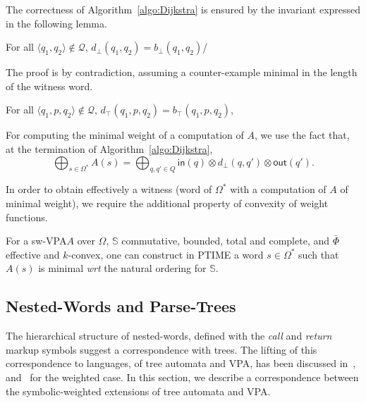 \documentclass[runningheads]{llncs}
\def\wrt{\textit{wrt}\xspace}
\def\<#1>{\langle #1 \rangle}
\newcommand{\Q}{\mathcal{Q}}
\newcommand{\Semiring}{\mathbb{S}}
\def\SWVPA{\textsf{sw-VPA}\xspace}
\begin{document}
The correctness of Algorithm~\ref{algo:Dijkstra} 
is ensured by the invariant expressed in the following lemma.
\begin{lemma}\label{lem:bot}
For all $\< q_1, q_2> \notin \Q$,
$d_\bot(q_1, q_2) =  b_\bot(q_1, q_2)$/
\end{lemma}
The proof is by contradiction, 
assuming a counter-example minimal in the length of the witness word.

\begin{lemma}\label{lem:top}
For all $\< q_1, p, q_2> \notin \Q$, 
$d_\top(q_1, p, q_2) =  b_\top(q_1, p, q_2)$,
\end{lemma}

\noindent
For computing the minimal weight of a computation of $A$, we use the fact that,
at the termination of Algorithm~\ref{algo:Dijkstra}, %
\[
  {\displaystyle \bigoplus_{s \in \Omega^*} A(s)} = 
  {\displaystyle\bigoplus_{q, q' \in Q}} \textstyle
  \mathsf{in}(q) \mathop{\otimes} d_\bot(q, q') \mathop{\otimes} \mathsf{out}(q').
\]

\noindent
In order to obtain effectively a witness 
(word of $\Omega^*$ with a computation of $A$ of minimal weight), 
we require the additional property of convexity of weight functions.

\begin{proposition}\label{th:best-search}
For a \SWVPA $A$ 
over $\Omega$, 
$\Semiring$ commutative, bounded, total and complete, %
and $\bar\Phi$ effective and $k$-convex, %
one can construct in PTIME a word $s \in \Omega^*$ 
such that $A(s)$ is minimal \wrt the natural ordering for $\Semiring$. 
\end{proposition} 



\subsection{Nested-Words and Parse-Trees}
\label{sec:trees}
The hierarchical structure of nested-words, defined with the \emph{call} and \emph{return} markup symbols  
suggest a correspondence with trees. 
The lifting of this correspondence to languages, of tree automata and VPA,
has been discussed in~\cite{AlurMadhusudan09nested}, 
and~\cite{Caralp12VPAmult} for the weighted case.
In this section, we describe a correspondence between the symbolic-weighted extensions
of tree automata and VPA.
\end{document}

